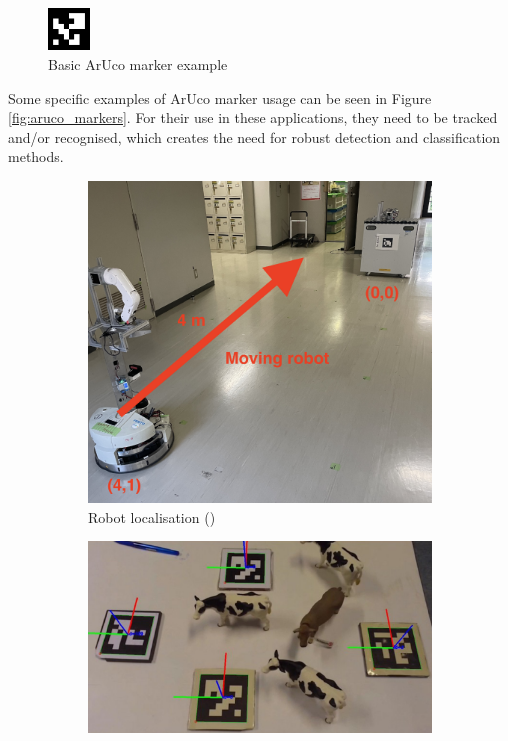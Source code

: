 \documentclass[conference]{IEEEtran}
\begin{document}
\begin{figure}[h]
    \centering
    \includegraphics[width=0.1\textwidth]{images/aruco-marker-1.png}
    \caption{Basic ArUco marker example}
    \label{fig:aruco_marker_basic}
\end{figure}

Some specific examples of ArUco marker usage can be seen in Figure \ref{fig:aruco_markers}. For their use in these applications, 
they need to be tracked and/or recognised, which creates the need for robust detection and classification methods.

\begin{figure}[h]
    \centering
    \begin{subfigure}[b]{0.45\textwidth}
        \centering
        \includegraphics[width=\textwidth]{images/aruco-example-1.png}
        \caption{Robot localisation (\cite{AI-Assisted-Drone-Localization})}
        \label{fig:aruco1}
    \end{subfigure}
    \hfill
    \begin{subfigure}[b]{0.45\textwidth}
        \centering
        \includegraphics[width=\textwidth]{images/aruco-example-2.png}

\end{subfigure}
\end{figure}
\end{document}
